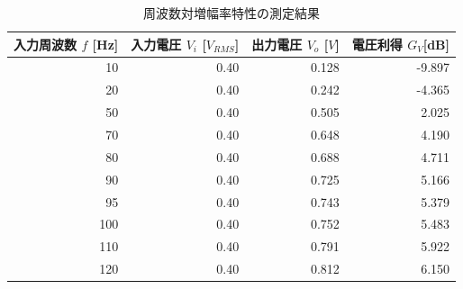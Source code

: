 \documentclass[dvipdfmx,titlepage,a4j]{jsarticle}  %
\numberwithin{equation}{section}
\begin{document}
\begin{table}[H]
  \caption{周波数対増幅率特性の測定結果}
  \begin{center}
    \begin{tabular}{r|r|r|r}
      \hline
      \multicolumn{1}{l|}{入力周波数 $f$ [Hz]} & \multicolumn{1}{l|}{入力電圧 $V_i$ [$V_{RMS}$]} & \multicolumn{1}{l|}{出力電圧 $V_o$ [$V$]} & \multicolumn{1}{l}{電圧利得 $G_V$[dB]} \\ \hline\hline
      10                                       & 0.40                                            & 0.128                                     & -9.897                                 \\ \hline
      20                                       & 0.40                                            & 0.242                                     & -4.365                                 \\ \hline
      50                                       & 0.40                                            & 0.505                                     & 2.025                                  \\ \hline
      70                                       & 0.40                                            & 0.648                                     & 4.190                                  \\ \hline
      80                                       & 0.40                                            & 0.688                                     & 4.711                                  \\ \hline
      90                                       & 0.40                                            & 0.725                                     & 5.166                                  \\ \hline
      95                                       & 0.40                                            & 0.743                                     & 5.379                                  \\ \hline
      100                                      & 0.40                                            & 0.752                                     & 5.483                                  \\ \hline
      110                                      & 0.40                                            & 0.791                                     & 5.922                                  \\ \hline
      120                                      & 0.40                                            & 0.812                                     & 6.150                                  \\ \hline

\end{tabular}
\end{center}
\end{table}
\end{document}
